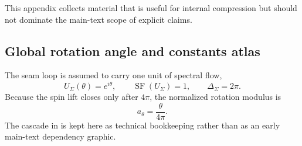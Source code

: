 \documentclass[11pt,a4paper]{article}
\theoremstyle{definition}
\theoremstyle{remark}
\DeclareMathOperator{\SF}{SF}
\newcommand{\Seam}{\Sigma}
\newcommand{\atheta}{a_\theta}
\begin{document}
This appendix collects material that is useful for internal compression but should not dominate the main-text scope of explicit claims.

\subsection{Global rotation angle and constants atlas}

The seam loop is assumed to carry one unit of spectral flow,
\[
U_{\Seam}(\theta)=e^{i\theta},
\qquad
\SF(U_{\Seam})=1,
\qquad
\Delta_{\Seam}=2\pi.
\]
Because the spin lift closes only after $4\pi$, the normalized rotation modulus is
\[
\atheta=\frac{\theta}{4\pi}.
\]
The cascade in  is kept here as technical bookkeeping rather than as an early main-text dependency graphic.
\end{document}
